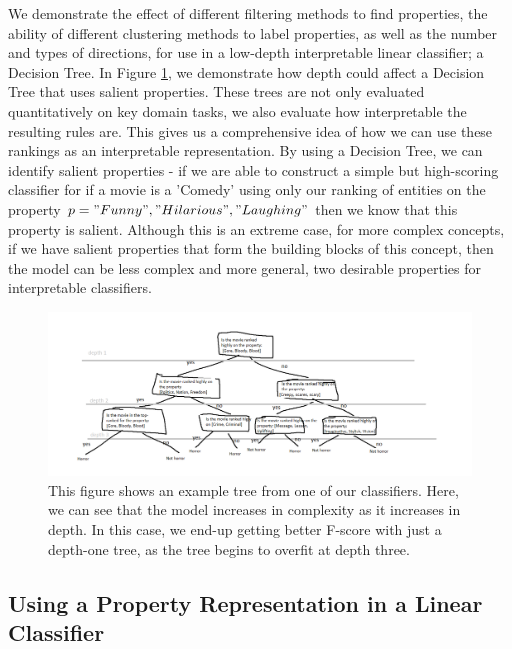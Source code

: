 We demonstrate the effect of different filtering methods to find properties, the ability of different clustering methods to label properties, as well as the number and types of directions, for use in a low-depth interpretable linear classifier; a Decision Tree. In Figure \ref{IntroDecisionTree}, we demonstrate how depth could affect a Decision Tree that uses salient properties. These trees are not only evaluated quantitatively on key domain tasks, we also evaluate how interpretable the resulting rules are. This gives us a comprehensive idea of how we can use these rankings as an interpretable representation. By using a Decision Tree, we can identify salient properties - if we are able to construct a simple but high-scoring classifier for if a movie is a 'Comedy' using only our ranking of entities on the property $p = {"Funny", "Hilarious", "Laughing"}$ then we know that this property is salient. Although this is an extreme case, for more complex concepts, if we have salient properties that form the building blocks of this concept, then the model can be less complex and more general, two desirable properties for interpretable classifiers. 

\begin{figure}[t]
	\includegraphics[width=\textwidth]{images/decisiontree.png}
	\centering
	\caption{This figure shows an example tree from one of our classifiers. Here, we can see that the model increases in complexity as it increases in depth. In this case, we end-up getting better F-score with just a depth-one tree, as the tree begins to overfit at depth three.  }\label{IntroDecisionTree}
\end{figure}



\subsection{Using a Property Representation in a Linear Classifier}


